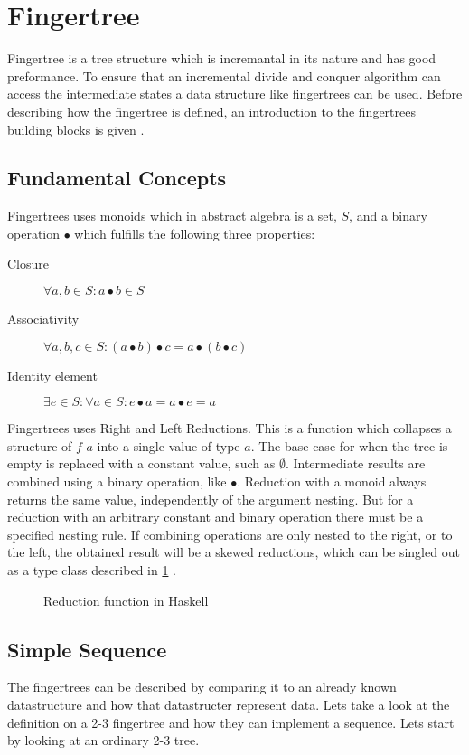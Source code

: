 \section{Fingertree}
Fingertree is a tree structure which is incremantal in its nature and has good
preformance. To ensure that an incremental divide and conquer algorithm can
access the intermediate states a data structure like fingertrees can be used.
Before describing how the fingertree is defined, an introduction to the
fingertrees building blocks is given \cite{fingertree}.

\subsection{Fundamental Concepts}

Fingertrees uses monoids which in abstract algebra is a set, $S$, and a binary
operation $\bullet$ which fulfills the following
three properties:
\begin{description}
\item[Closure] $\forall a,b \in S: a \bullet b \in S$
\item[Associativity] $\forall a,b,c \in S: (a \bullet b) \bullet c = a \bullet
    (b \bullet c)$ 
\item[Identity element] $\exists e \in S: \forall a \in S: e \bullet a = a
    \bullet e = a$
\end{description}

Fingertrees uses Right and Left Reductions. This is a function which
collapses a structure of $f$ $a$ into a single value of type $a$. The base case
for when the tree is empty is replaced with a constant value, such as 
$\emptyset$. Intermediate results are combined using a binary operation, like
$\bullet$. Reduction with a monoid always returns the same value,
independently of the argument nesting. But for a reduction with an arbitrary
constant and binary operation there must be a specified nesting rule. If
combining operations are only nested to the right, or to the left, the obtained
result will be a skewed reductions, which can be singled out as a type class
described in \cref{fig:Reduction} \cite{fingertree}.

\begin{figure}[h!]

\caption{Reduction function in Haskell \label{fig:Reduction}}
\end{figure}

\subsection{Simple Sequence}
The fingertrees can be described by comparing it to an already
known datastructure and how that datastructer represent data. Lets take a look
at the definition on a 2-3 fingertree and how they can implement a sequence.
Lets start by looking at an ordinary 2-3 tree.

